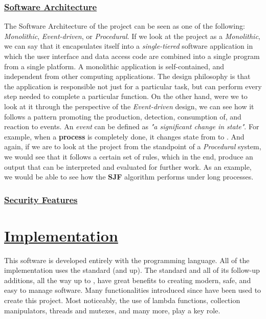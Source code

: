 \documentclass{article}
\newcommand{\code}[1]{\codeinline{\texttt{#1}}}
\begin{document}
\subsubsection{\underline{Software Architecture}}

The Software Architecture of the project can be seen as one of the following: \textit{Monolithic}, \textit{Event-driven}, or \textit{Procedural}. If we look at the project as a \textit{Monolithic}, we can say that it encapsulates itself into a \textit{single-tiered} software application in which the user interface and data access code are combined into a single program from a single platform. A monolithic application is self-contained, and independent from other computing applications. The design philosophy is that the application is responsible not just for a particular task, but can perform every step needed to complete a particular function. On the other hand, were we to look at it through the perspective of the \textit{Event-driven} design, we can see how it follows a pattern promoting the production, detection, consumption of, and reaction to events. An \textit{event} can be defined as \textit{"a significant change in state"}. For example, when a \textbf{process} \code{ttl} is completely done, it changes state from \code{RUNNING} to \code{DONE}. And again, if we are to look at the project from the standpoint of a \textit{Procedural} system, we would see that it follows a certain set of rules, which in the end, produce an output that can be interpreted and evaluated for further work. As an example, we would be able to see how the \textbf{SJF} algorithm performs under long processes.

\subsubsection{\underline{Security Features}}

\section{\underline{Implementation}}

This software is developed entirely with the \code{C++} programming language. All of the implementation uses the \code{C++ 11} standard (and up). The \code{C++ 11} standard and all of its follow-up additions, all the way up to \code{C++ 20}, have great benefits to creating modern, safe, and easy to manage software. Many functionalities introduced since \code{C++ 11} have been used to create this project. Most noticeably, the use of lambda functions, collection manipulators, threads and mutexes, and many more, play a key role.
\end{document}

